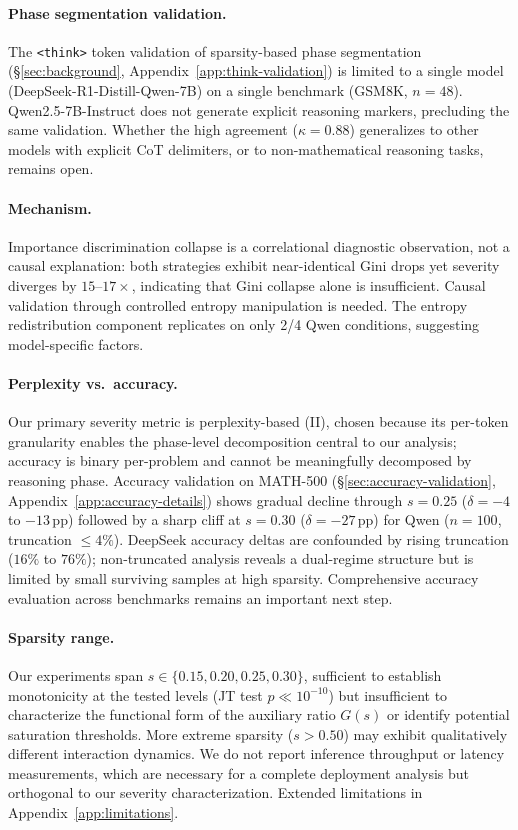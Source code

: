 \paragraph{Phase segmentation validation.}
The \texttt{<think>} token validation of sparsity-based phase segmentation (\S\ref{sec:background}, Appendix~\ref{app:think-validation}) is limited to a single model (DeepSeek-R1-Distill-Qwen-7B) on a single benchmark (GSM8K, $n{=}48$). Qwen2.5-7B-Instruct does not generate explicit reasoning markers, precluding the same validation. Whether the high agreement ($\kappa{=}0.88$) generalizes to other models with explicit CoT delimiters, or to non-mathematical reasoning tasks, remains open.

\paragraph{Mechanism.}
Importance discrimination collapse is a correlational diagnostic observation, not a causal explanation: both strategies exhibit near-identical Gini drops yet severity diverges by $15$--$17{\times}$, indicating that Gini collapse alone is insufficient. Causal validation through controlled entropy manipulation is needed. The entropy redistribution component replicates on only 2/4 Qwen conditions, suggesting model-specific factors.

\paragraph{Perplexity vs.\ accuracy.}
Our primary severity metric is perplexity-based (II), chosen because its per-token granularity enables the phase-level decomposition central to our analysis; accuracy is binary per-problem and cannot be meaningfully decomposed by reasoning phase. Accuracy validation on MATH-500 (\S\ref{sec:accuracy-validation}, Appendix~\ref{app:accuracy-details}) shows gradual decline through $s{=}0.25$ ($\delta{=}-4$ to $-13$\,pp) followed by a sharp cliff at $s{=}0.30$ ($\delta{=}-27$\,pp) for Qwen ($n{=}100$, truncation $\leq 4\%$). DeepSeek accuracy deltas are confounded by rising truncation ($16\%$ to $76\%$); non-truncated analysis reveals a dual-regime structure but is limited by small surviving samples at high sparsity. Comprehensive accuracy evaluation across benchmarks remains an important next step.

\paragraph{Sparsity range.}
Our experiments span $s \in \{0.15, 0.20, 0.25, 0.30\}$, sufficient to establish monotonicity at the tested levels (JT test $p \ll 10^{-10}$) but insufficient to characterize the functional form of the auxiliary ratio $G(s)$ or identify potential saturation thresholds. More extreme sparsity ($s > 0.50$) may exhibit qualitatively different interaction dynamics. We do not report inference throughput or latency measurements, which are necessary for a complete deployment analysis but orthogonal to our severity characterization. Extended limitations in Appendix~\ref{app:limitations}.
